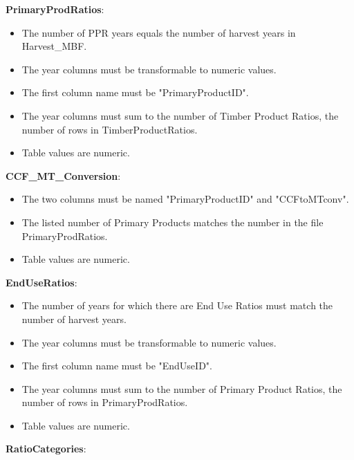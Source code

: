 \documentclass[
  openany]{book}
\providecommand{\tightlist}{%
  \setlength{\itemsep}{0pt}\setlength{\parskip}{0pt}}
\begin{document}
\textbf{PrimaryProdRatios}:

\begin{itemize}
\tightlist
\item
  The number of PPR years equals the number of harvest years in Harvest\_MBF.\\
\item
  The year columns must be transformable to numeric values.\\
\item
  The first column name must be "PrimaryProductID".\\
\item
  The year columns must sum to the number of Timber Product Ratios, the number of rows in TimberProductRatios.\\
\item
  Table values are numeric.
\end{itemize}

\textbf{CCF\_MT\_Conversion}:

\begin{itemize}
\tightlist
\item
  The two columns must be named "PrimaryProductID" and "CCFtoMTconv".\\
\item
  The listed number of Primary Products matches the number in the file PrimaryProdRatios.\\
\item
  Table values are numeric.
\end{itemize}

\textbf{EndUseRatios}:

\begin{itemize}
\tightlist
\item
  The number of years for which there are End Use Ratios must match the number of harvest years.\\
\item
  The year columns must be transformable to numeric values.\\
\item
  The first column name must be "EndUseID".\\
\item
  The year columns must sum to the number of Primary Product Ratios, the number of rows in PrimaryProdRatios.\\
\item
  Table values are numeric.
\end{itemize}

\textbf{RatioCategories}:
\end{document}
